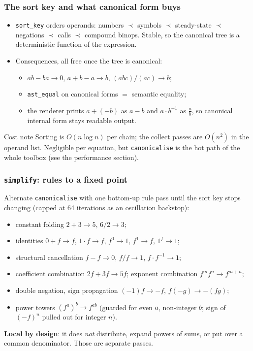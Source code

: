 \documentclass[10pt,slidestop]{beamer}
\newcommand{\code}[1]{\texttt{#1}}
\begin{document}
\begin{frame}\frametitle{The sort key and what canonical form buys}
  \begin{itemize}
  \item \code{sort\_key} orders operands: numbers $\prec$ symbols $\prec$
    steady-state $\prec$ negations $\prec$ calls $\prec$ compound binops. Stable,
    so the canonical tree is a deterministic function of the expression.\newline
  \item Consequences, all free once the tree is canonical:
    \begin{itemize}
    \item[--] $a b - b a \to 0$, $a + b - a \to b$, $(abc)/(ac) \to b$;
    \item[--] \code{ast\_equal} on canonical forms $=$ semantic equality;
    \item[--] the renderer prints $a + (-b)$ as $a - b$ and $a\cdot b^{-1}$ as
      $\tfrac{a}{b}$, so canonical internal form stays readable output.
    \end{itemize}
  \end{itemize}

  \begin{alertblock}{Cost note}
    Sorting is $O(n\log n)$ per chain; the collect passes are $O(n^2)$ in the
    operand list. Negligible per equation, but \code{canonicalise} is the hot
    path of the whole toolbox (see the performance section).
  \end{alertblock}
\end{frame}

\begin{frame}\frametitle{\texttt{simplify}: rules to a fixed point}
  Alternate \code{canonicalise} with one bottom-up rule pass until the sort key
  stops changing (capped at 64 iterations as an oscillation backstop):

  \smallskip
  \begin{itemize}\footnotesize
  \item constant folding \; $2+3\to5$, \; $6/2\to3$;
  \item identities \; $0{+}f\to f$, \; $1\cdot f\to f$, \; $f^0\to1$, \;
    $f^1\to f$, \; $1^f\to1$;
  \item structural cancellation \; $f-f\to0$, \; $f/f\to1$, \;
    $f\cdot f^{-1}\to1$;
  \item coefficient combination \; $2f + 3f \to 5f$;
    exponent combination \; $f^m f^n \to f^{m+n}$;
  \item double negation, sign propagation \; $(-1)f\to-f$, \; $f(-g)\to-(fg)$;
  \item power towers \; $(f^a)^b\to f^{ab}$ (guarded for even $a$, non-integer
    $b$; sign of $(-f)^n$ pulled out for integer $n$).
  \end{itemize}

  \smallskip
  \textbf{Local by design}: it does \emph{not} distribute, expand powers of
  sums, or put over a common denominator. Those are separate passes.
\end{frame}
\end{document}
